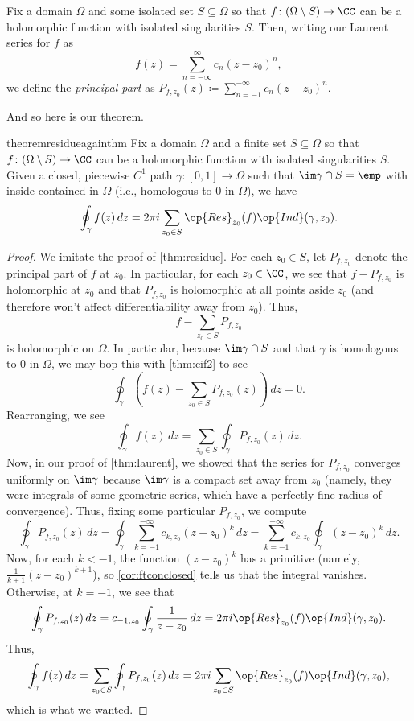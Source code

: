 \documentclass[../notes.tex]{subfiles}
\begin{document}
\begin{definition}[Residue]
	Fix a domain $\Omega$ and some isolated set $S\subseteq\Omega$ so that $f\colon(\Omega\setminus S)\to\CC$ can be a holomorphic function with isolated singularities $S$. Then, writing our Laurent series for $f$ as
	\[f(z)=\sum_{n=-\infty}^\infty c_n(z-z_0)^n,\]
	we define the \textit{principal part} as $P_{f,z_0}(z)\coloneqq \sum_{n=-1}^{-\infty} c_n(z-z_0)^n$.
\end{definition}
And so here is our theorem.
\begin{restatable}[Residue]{theorem}{residueagainthm} \label{thm:residue2}
	Fix a domain $\Omega$ and a finite set $S\subseteq\Omega$ so that $f\colon(\Omega\setminus S)\to\CC$ can be a holomorphic function with isolated singularities $S$. Given a closed, piecewise $C^1$ path $\gamma\colon[0,1]\to\Omega$ such that $\im\gamma\cap S=\emp$ with inside contained in $\Omega$ (i.e., homologous to $0$ in $\Omega$), we have
	\[\oint_\gamma f(z)\,dz=2\pi i\sum_{z_0\in S}\op{Res}_{z_0}(f)\op{Ind}(\gamma,z_0).\]
\end{restatable}
\begin{proof}
	We imitate the proof of \autoref{thm:residue}. For each $z_0\in S$, let $P_{f,z_0}$ denote the principal part of $f$ at $z_0$. In particular, for each $z_0\in\CC$, we see that $f-P_{f,z_0}$ is holomorphic at $z_0$ and that $P_{f,z_0}$ is holomorphic at all points aside $z_0$ (and therefore won't affect differentiability away from $z_0$). Thus,
	\[f-\sum_{z_0\in S}P_{f,z_0}\]
	is holomorphic on $\Omega$. In particular, because $\im\gamma\cap S$ and that $\gamma$ is homologous to $0$ in $\Omega$, we may bop this with \autoref{thm:cif2} to see
	\[\oint_\gamma\left(f(z)-\sum_{z_0\in S}P_{f,z_0}(z)\right)\,dz=0.\]
	Rearranging, we see
	\[\oint_\gamma f(z)\,dz=\sum_{z_0\in S}\oint_\gamma P_{f,z_0}(z)\,dz.\]
	Now, in our proof of \autoref{thm:laurent}, we showed that the series for $P_{f,z_0}$ converges uniformly on $\im\gamma$ because $\im\gamma$ is a compact set away from $z_0$ (namely, they were integrals of some geometric series, which have a perfectly fine radius of convergence). Thus, fixing some particular $P_{f,z_0}$, we compute
	\[\oint_\gamma P_{f,z_0}(z)\,dz = \oint_\gamma\sum_{k=-1}^{-\infty}c_{k,z_0}(z-z_0)^k\,dz = \sum_{k=-1}^{-\infty}c_{k,z_0}\oint_\gamma (z-z_0)^k\,dz.\]
	Now, for each $k<-1$, the function $(z-z_0)^k$ has a primitive (namely, $\frac1{k+1}(z-z_0)^{k+1}$), so \autoref{cor:ftconclosed} tells us that the integral vanishes. Otherwise, at $k=-1$, we see that
	\[\oint_\gamma P_{f,z_0}(z)\,dz = c_{-1,z_0}\oint_\gamma\frac1{z-z_0}\,dz=2\pi i\op{Res}_{z_0}(f)\op{Ind}(\gamma,z_0).\]
	Thus,
	\[\oint_\gamma f(z)\,dz=\sum_{z_0\in S}\oint_\gamma P_{f,z_0}(z)\,dz=2\pi  i\sum_{z_0\in S}\op{Res}_{z_0}(f)\op{Ind}(\gamma,z_0),\]
	which is what we wanted.
\end{proof}
\end{document}
